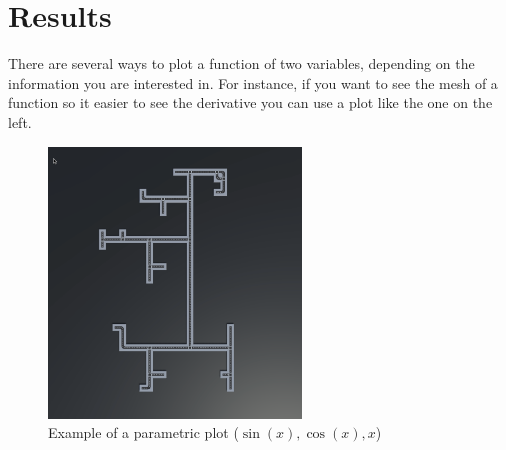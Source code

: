 \chapter{Results}



There are several ways to plot a function of two variables, depending on the information you are interested in. For instance, if you want to see the mesh of a function so it easier to see the derivative you can use a plot like the one on the left.

\begin{figure}[h]
\caption{Example of a parametric plot ($\sin (x), \cos(x), x$)}
\vspace{0.3cm}
\centering
\includegraphics[width=0.6\textwidth]{5. results/Road Outpu.png}
\end{figure}

